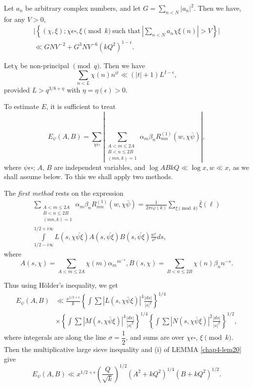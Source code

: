 \begin{Lemma}\label{chap4-lem21}%
Let $a_n$ be arbitrary complex numbers, and let $G = \sum\limits_{n
  <N} |a_n|^2$. Then we have, for any $V >0$, 
\begin{multline*}
\Bigg|\left\{ (\chi, \xi); \chi \epsilon  \square, \xi \pmod{k} ~\text{such that
}~| \sum\limits_{n <N} a_n \chi \xi (n)| > V \right\}\Bigg| \\
\ll GNV^{-2} + G^3 NV^{-6} (kQ^2) ^{1-\epsilon }.
\end{multline*}
\end{Lemma}

\begin{Lemma}\label{chap4-lem22}%
Let\pageoriginale $\chi$ be non-principal $\pmod{q}$. Then we have 
$$
\sum_{n < L} \chi(n)n^{it} \ll (|t| + 1)L^{I-\epsilon },
$$
provided $L > q^{3/8 + \eta}$ with $\eta = \eta (\epsilon ) > 0$.
\end{Lemma}

To estimate $E$, it is sufficient to treat
$$
  E_{\psi}(A,B) = \sum_{\chi \epsilon  \square }| \sum_{\substack{A < m
      \le 2A\\ B < n \le 2B\\ (mn,k)=1}} \alpha_m \beta_n R_{mn}^{(1)}
  (w,\chi \bar{\psi})|, 
$$
where $\psi \epsilon  \square $; $A$, $B$ are independent variables, and
$\log ABkQ \ll \log x, w \ll x$, as we shall assume below. To this we
shall apply two methods. 

The \textit{first method} rests on the expression
\begin{multline*}
  \sum_{\substack{A < m \le 2A\\ B < n \le 2B\\ (mn,k)=1}} \alpha_m
  \beta_n R_{mn}^{(1)} (w, \chi \bar{\psi}) 
  =\frac{1}{2 \pi i \varphi(k)} \sum_{\xi \pmod{k}} \bar{\xi}(\ell)\\
  \int\limits_{1/2 - i \infty}^{1/2 + i \infty} L (s, \chi \bar{\psi
    \xi}) A (s,\bar{\psi \xi}) B (s,\bar{\psi \xi}) \frac{w^s}{s^2}
  ds, \tag{4.3.3} \label{eq4.3.3}
\end{multline*}
where
$$
A(s, \chi) =\sum\limits_{A <m \le 2A} \chi (m)
{\alpha{_m}}{^{m{^{-s}}}}, B(s, \chi) = \sum_{B < n \le 2B}
\chi(n)\beta_n n^{-s}. 
$$

Thus using H\"{o}lder's inequality, we get 
\begin{align*}
  E_\psi (A,B) & \ll \frac{x^{1/2+ \epsilon }}{k} \left\{ \int \sum |L(s,
  \chi \bar{\psi} \xi)|^4 \frac{|ds|} {|s|^2}\right\}^{1/4}\\ 
  & \times \left\{ \int \sum  |M  (s, \chi \bar{\psi} \xi)|^4  \frac{|ds|}
       {|s|^2}\right\}^{1/4}  \left\{ \int \sum  |N  (s, \chi \bar{\psi}
       \xi)|^2  \frac{|ds|}{|s|^2}\right\}^{1/2},  
\end{align*}\pageoriginale
where integerals are along the line $\sigma =  \dfrac{1}{2}$, and sums
are over $\chi \epsilon  \square $, $\xi \pmod{k}$. Then the
multiplicative large sieve inequality and (i) of LEMMA \ref{chap4-lem20} give 
$$
E_\psi (A,B) \ll x^{1/2 + \epsilon }
\left(\frac{Q}{\sqrt{k}}\right)^{1/2} 
\left(A^2 + kQ^2\right)^{1/4} (B +kQ^2)^{1/2}. 
$$

